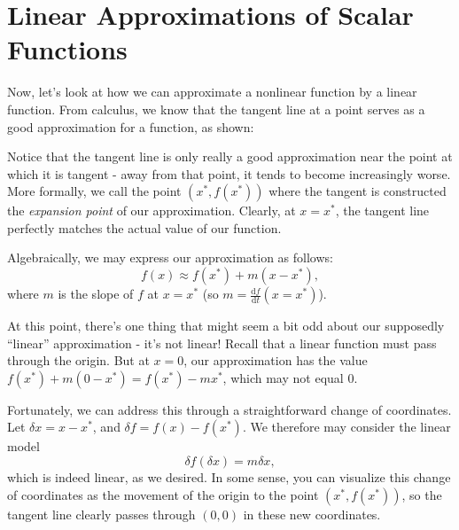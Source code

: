 \documentclass[letterpaper]{article}
\theoremstyle{remark}
\newcommand{\dt}{\mathrm{d}t}
\newcommand{\df}{\mathrm{d}f}
\begin{document}
\section{Linear Approximations of Scalar Functions}
Now, let's look at how we can approximate a nonlinear function by a linear function. From calculus, we know that the tangent line at a point serves as a good approximation for a function, as shown:
\begin{center}
\end{center}

Notice that the tangent line is only really a good approximation near the point at which it is tangent - away from that point, it tends to become increasingly worse. More formally, we call the point $(x^*, f(x^*))$ where the tangent is constructed the \emph{expansion point} of our approximation. Clearly, at $x = x^*$, the tangent line perfectly matches the actual value of our function.

Algebraically, we may express our approximation as follows:
\[
    f(x) \approx f(x^*) + m(x - x^*),
\]
where $m$ is the slope of $f$ at $x = x^*$ (so $m = \frac{\df}{\dt}(x = x^*)$).

At this point, there's one thing that might seem a bit odd about our supposedly ``linear'' approximation - it's not linear! Recall that a linear function must pass through the origin. But at $x = 0$, our approximation has the value $f(x^*) + m(0 - x^*) = f(x^*) - mx^*$, which may not equal $0$.

Fortunately, we can address this through a straightforward change of coordinates. Let $\delta x = x - x^*$, and $\delta f = f(x) - f(x^*)$. We therefore may consider the linear model
\[
    \delta f(\delta x) = m\delta x,
\]
which is indeed linear, as we desired. In some sense, you can visualize this change of coordinates as the movement of the origin to the point $(x^*, f(x^*))$, so the tangent line clearly passes through $(0, 0)$ in these new coordinates.
\end{document}
